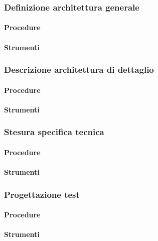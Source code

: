 \subsubsection{Definizione architettura generale}

\paragraph{Procedure}

\paragraph{Strumenti}


\subsubsection{Descrizione architettura di dettaglio}

\paragraph{Procedure}

\paragraph{Strumenti}


\subsubsection{Stesura specifica tecnica}

\paragraph{Procedure}

\paragraph{Strumenti}

\subsubsection{Progettazione test}

\paragraph{Procedure}

\paragraph{Strumenti}





